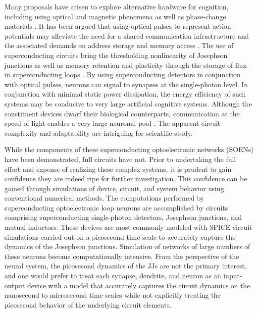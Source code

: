 \documentclass[twocolumn]{article}
\begin{document}
Many proposals have arisen to explore alternative hardware for cognition, including using optical \cite{psfa1985,faps1985,abps1987,waps1993,safi1995,mosc1997,hoiz2000,moho2000,rokr2009,krfo2011,dusc2012,nash2013,prsh2017,shha2017,pena2018,tafe2019} and magnetic \cite{} phenomena as well as phase-change materials \cite{chsa2019,feyo2019}. It has been argued that using optical pulses to represent action potentials may alleviate the need for a shared communication infrastructure and the associated demands on address storage and memory access \cite{shbu2017,sh2019}. The use of superconducting circuits bring the thresholding nonlinearity of Josephson junctions \cite{vatu1998,ka1999} as well as memory retention and plasticity through the storage of flux in superconducting loops \cite{sh2019}. By using superconducting detectors \cite{nata2012} in conjunction with optical pulses, neurons can signal to synapses at the single-photon level. In conjunction with minimal static power dissipation, the energy efficiency of such systems may be conducive to very large artificial cognitive systems. Although the constituent devices dwarf their biological counterparts, communication at the speed of light enables a very large neuronal pool \cite{sh2019,sh2018_ICRC}. The apparent circuit complexity and adaptability are intriguing for scientific study.

While the components of these superconducting optoelectronic networks (SOENs) have been demonstrated, full circuits have not. Prior to undertaking the full effort and expense of realizing these complex systems, it is prudent to gain confidence they are indeed ripe for further investigation. This confidence can be gained through simulations of device, circuit, and system behavior using conventional numerical methods. The computations performed by superconducting optoelectronic loop neurons are accomplished by circuits comprising superconducting single-photon detectors, Josephson junctions, and mutual inductors. These devices are most commonly modeled with SPICE circuit simulations carried out on a picosecond time scale to accurately capture the dynamics of the Josephson junctions. Simulation of networks of large numbers of these neurons become computationally intensive. From the perspective of the neural system, the picosecond dynamics of the JJs are not the primary interest, and one would prefer to treat each synapse, dendrite, and neuron as an input-output device with a model that accurately captures the circuit dynamics on the nanosecond to microsecond time scales while not explicitly treating the picosecond behavior of the underlying circuit elements.
\end{document}
